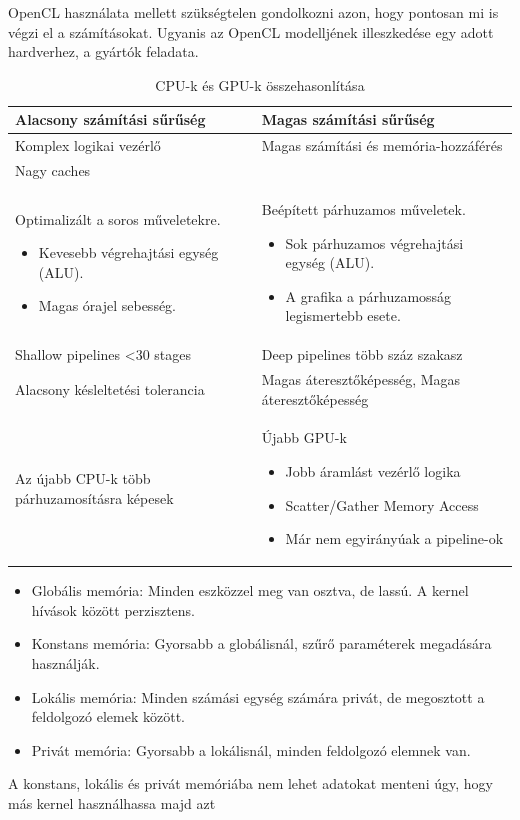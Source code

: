 OpenCL használata mellett szükségtelen gondolkozni azon, hogy pontosan mi is végzi el a számításokat. Ugyanis az OpenCL modelljének illeszkedése egy adott hardverhez, a gyártók feladata.

\begin{table}[h!]
\centering
\caption{CPU-k és GPU-k összehasonlítása}
\medskip
\label{tab:cpuvsgpu}
\begin{tabular}{|p{7cm}|p{7cm}|}
\hline
Alacsony számítási sűrűség & Magas számítási sűrűség \\
\hline
Komplex logikai vezérlő & Magas számítási és memória-hozzáférés \\
\hline
Nagy caches &   \\
\hline
Optimalizált a soros műveletekre.
\begin{itemize}
	\item Kevesebb végrehajtási egység (ALU).
	\item Magas órajel sebesség.
\end{itemize} & Beépített párhuzamos műveletek.
\begin{itemize}
	\item Sok párhuzamos végrehajtási egység (ALU).
	\item A grafika a párhuzamosság legismertebb esete.
\end{itemize} \\
\hline
Shallow pipelines <30 stages & Deep pipelines több száz szakasz \\
\hline
Alacsony késleltetési tolerancia & Magas áteresztőképesség, Magas áteresztőképesség \\
\hline
Az újabb CPU-k több párhuzamosításra képesek & Újabb GPU-k
\begin{itemize}
	\item Jobb áramlást vezérlő logika
	\item Scatter/Gather Memory Access
	\item Már nem egyirányúak a pipeline-ok
\end{itemize} \\
\hline
\end{tabular}
\end{table}

\begin{itemize}
\item Globális memória: Minden eszközzel meg van osztva, de lassú. A kernel hívások között perzisztens. 
\item Konstans memória: Gyorsabb a globálisnál, szűrő paraméterek megadására használják.
\item Lokális memória: Minden számási egység számára privát, de megosztott a feldolgozó elemek között.
\item Privát memória: Gyorsabb a lokálisnál, minden feldolgozó elemnek van.
\end{itemize} 
A konstans, lokális és privát memóriába nem lehet adatokat menteni úgy, hogy más kernel használhassa majd azt




